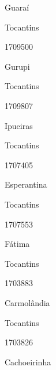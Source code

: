 \documentclass[
  letterpaper,
]{report}
\begin{document}
\n      

Guaraí

\n    

\n    

\n      

Tocantins

\n      

1709500

\n      

Gurupi

\n    

\n    

\n      

Tocantins

\n      

1709807

\n      

Ipueiras

\n    

\n    

\n      

Tocantins

\n      

1707405

\n      

Esperantina

\n    

\n    

\n      

Tocantins

\n      

1707553

\n      

Fátima

\n    

\n    

\n      

Tocantins

\n      

1703883

\n      

Carmolândia

\n    

\n    

\n      

Tocantins

\n      

1703826

\n      

Cachoeirinha

\n    

\n    

\n      
\end{document}
